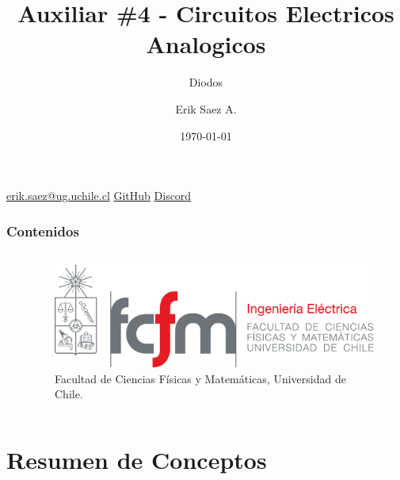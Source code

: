 \documentclass[
    10pt,
    aspectratio=169,
    xcolor={dvipsnames},
    spanish,
    ]{beamer}
\title[Auxiliar \#4 - Circuitos Electricos Analogicos]{\bfseries Auxiliar \#4 - Circuitos Electricos Analogicos}
\subtitle{Diodos}
\author[Erik Saez A.]{Erik Saez A.}
\institute[UChile]{Department of Electrical Engineering \\ Universidad de Chile}
\date{\today}
\begin{document}
\begin{frame}
  \titlepage
  \centering
   \href{mailto:erik.saez@ug.uchile.cl}{erik.saez@ug.uchile.cl} \hspace{.2cm}
   \href{https://github.com/ErikSaezA}{GitHub} \hspace{.2cm}
   \href{https://discord.gg/ubthV3cudQ}{Discord}
\end{frame}
\begin{frame}
  \frametitle{Contenidos}
  \centering
  \begin{columns}
    \begin{column}{0.4\textwidth}
      \tableofcontents
    \end{column}
    \begin{column}{0.5\textwidth}
      \begin{figure}
        \centering
        \includegraphics[width=\textwidth]{fcfm_die}
        \caption{Facultad de Ciencias Físicas y Matemáticas, Universidad de Chile.}
      \end{figure}
    \end{column}
  \end{columns}  
\end{frame}

\section{Resumen de Conceptos}



\end{document}
